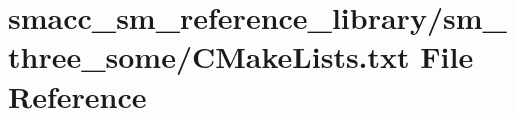 \hypertarget{sm__reference__library_2sm__three__some_2CMakeLists_8txt}{}\section{smacc\+\_\+sm\+\_\+reference\+\_\+library/sm\+\_\+three\+\_\+some/\+C\+Make\+Lists.txt File Reference}
\label{sm__reference__library_2sm__three__some_2CMakeLists_8txt}

